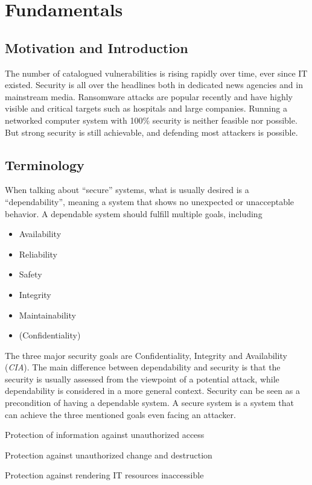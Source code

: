 \chapter{Fundamentals}
\section{Motivation and Introduction}
The number of catalogued vulnerabilities is rising rapidly over time, ever since
IT existed. Security is all over the headlines both in dedicated news agencies
and in mainstream media. Ransomware attacks are popular recently and have highly
visible and critical targets such as hospitals and large companies. Running a
networked computer system with 100\% security is neither feasible nor possible.
But strong security is still achievable, and defending most attackers is
possible.

\section{Terminology}
When talking about ``secure'' systems, what is usually desired is a
``dependability'', meaning a system that shows no unexpected or unacceptable
behavior. A dependable system should fulfill multiple goals, including
\begin{itemize}
    \item Availability
    \item Reliability
    \item Safety
    \item Integrity
    \item Maintainability
    \item (Confidentiality)
\end{itemize}

The three major security goals are Confidentiality, Integrity and Availability
(\emph{CIA}). The main difference between dependability and security is that the
security is usually assessed from the viewpoint of a potential attack, while
dependability is considered in a more general context. Security can be seen as a
precondition of having a dependable system. A secure system is a system that can
achieve the three mentioned goals even facing an attacker.

\begin{description}[align=right,labelwidth=3cm]
    \item[Confidentiality] Protection of information against unauthorized access
    \item[Integrity] Protection against unauthorized change and destruction
    \item[Availability] Protection against rendering IT resources inaccessible
\end{description}

